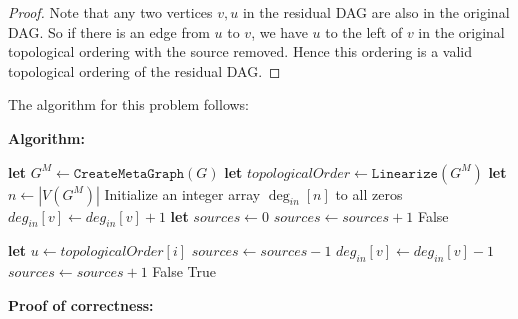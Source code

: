 \documentclass[answers]{exam}
\begin{document}
\begin{questions}
\begin{solution}
\begin{proof}
Note that any two vertices $v, u$ in the residual DAG are also in the original DAG. So if there is an edge from $u$ to $v$, we have $u$ to the left of $v$ in the original topological ordering with the source removed. Hence this ordering is a valid topological ordering of the residual DAG.
\end{proof} 

The algorithm for this problem follows:

\textbf{Algorithm:}

\begin{algorithmic}[1]
    \State \textbf{let} $G^M \gets \texttt{CreateMetaGraph}(G)$
    \State \textbf{let} $topologicalOrder \gets \texttt{Linearize}(G^M)$
    \State \textbf{let} $n \gets |V(G^M)|$
    \State Initialize an integer array $\deg_{in}[n]$ to all zeros
            \State $deg_{in}[v] \gets deg_{in}[v] + 1$ 
        \EndFor
    \EndFor
    \State \textbf{let} $sources \gets 0$
            \State $sources \gets sources + 1$ 
        \EndIf
    \EndFor
        \State \Return False
    \EndIf
        
        \State \textbf{let} $u \gets topologicalOrder[i]$
        \State $sources \gets sources - 1$ 
            \State $deg_{in}[v] \gets deg_{in}[v] - 1$
                \State $sources \gets sources + 1$ 
            \EndIf
        \EndFor
            \State \Return False
        \EndIf
    \EndFor
    \State \Return True
\EndProcedure
\end{algorithmic}


\textbf{Proof of correctness:}


\end{solution}
\end{questions}
\end{document}
